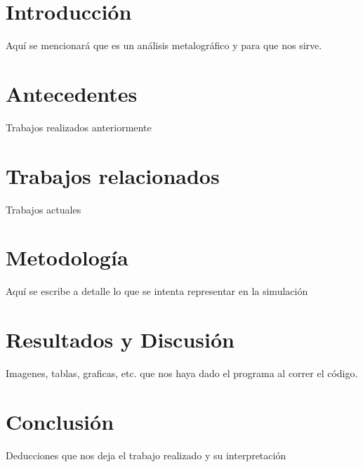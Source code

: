 \documentclass[10pt,twocolumn]{article}
\begin{document}


\section{Introducci\'on}\label{intro}
 
Aqu\'i se mencionar\'a que es un an\'alisis metalogr\'afico y para que nos sirve.


\section{Antecedentes}\label{antes}

Trabajos realizados anteriormente \cite{satuelisa}


\section{Trabajos relacionados}\label{trabajos}

Trabajos actuales \cite{doctora}

 

\section{Metodolog\'{i}a}\label{met}

Aqu\'i se escribe a detalle lo que se intenta representar en la simulaci\'on



\section{Resultados y Discusi\'{o}n}\label{res}

Imagenes, tablas, graficas, etc. que nos haya dado el programa al correr el c\'odigo.


\section{Conclusi\'{o}n}\label{con}

Deducciones que nos deja el trabajo realizado y su interpretaci\'on \cite{yo} 


  
  
\end{document}
